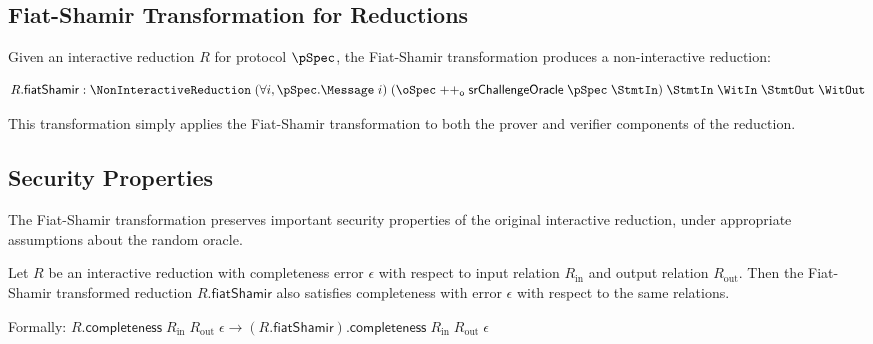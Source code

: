 \subsection{Fiat-Shamir Transformation for Reductions}\label{sec:fiat_shamir_reduction}

\begin{definition}
    \label{def:reduction_fiat_shamir}
    Given an interactive reduction $R$ for protocol $\pSpec$, the Fiat-Shamir transformation produces a non-interactive reduction:

    \[ R.\mathsf{fiatShamir} : \NonInteractiveReduction \;(\forall i, \pSpec.\Message \;i) \;(\oSpec \mathrel{++_\mathsf{o}} \mathsf{srChallengeOracle} \;\pSpec \;\StmtIn) \;\StmtIn \;\WitIn \;\StmtOut \;\WitOut \]

    This transformation simply applies the Fiat-Shamir transformation to both the prover and verifier components of the reduction.
\end{definition}

\subsection{Security Properties}\label{sec:fiat_shamir_security}

The Fiat-Shamir transformation preserves important security properties of the original interactive reduction, under appropriate assumptions about the random oracle.

\begin{theorem}
    \label{thm:fiat_shamir_completeness}
    Let $R$ be an interactive reduction with completeness error $\epsilon$ with respect to input relation $R_{\text{in}}$ and output relation $R_{\text{out}}$. Then the Fiat-Shamir transformed reduction $R.\mathsf{fiatShamir}$ also satisfies completeness with error $\epsilon$ with respect to the same relations.

    Formally: $R.\mathsf{completeness} \;R_{\text{in}} \;R_{\text{out}} \;\epsilon \to (R.\mathsf{fiatShamir}).\mathsf{completeness} \;R_{\text{in}} \;R_{\text{out}} \;\epsilon$
\end{theorem}

